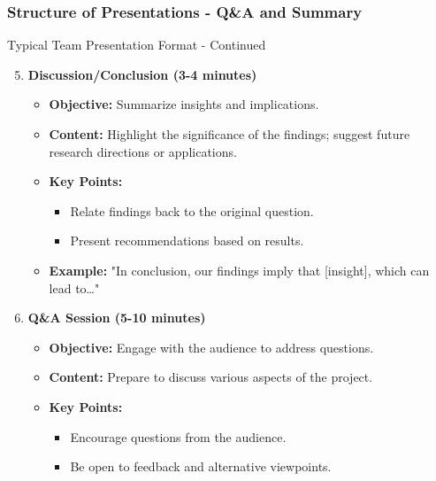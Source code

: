 \documentclass{beamer}
\begin{document}
\begin{frame}[fragile]
    \frametitle{Structure of Presentations - Q\&A and Summary}
    \begin{block}{Typical Team Presentation Format - Continued}
        \begin{enumerate}
            \setcounter{enumi}{4} %
            \item \textbf{Discussion/Conclusion (3-4 minutes)}
                \begin{itemize}
                    \item \textbf{Objective:} Summarize insights and implications.
                    \item \textbf{Content:} Highlight the significance of the findings; suggest future research directions or applications.
                    \item \textbf{Key Points:}
                        \begin{itemize}
                            \item Relate findings back to the original question.
                            \item Present recommendations based on results.
                        \end{itemize}
                    \item \textbf{Example:} "In conclusion, our findings imply that [insight], which can lead to…"
                \end{itemize}

            \item \textbf{Q\&A Session (5-10 minutes)}
                \begin{itemize}
                    \item \textbf{Objective:} Engage with the audience to address questions.
                    \item \textbf{Content:} Prepare to discuss various aspects of the project.
                    \item \textbf{Key Points:}
                        \begin{itemize}
                            \item Encourage questions from the audience.
                            \item Be open to feedback and alternative viewpoints.
                        \end{itemize}
                \end{itemize}
        \end{enumerate}
    \end{block}
    

\end{frame}
\end{document}
